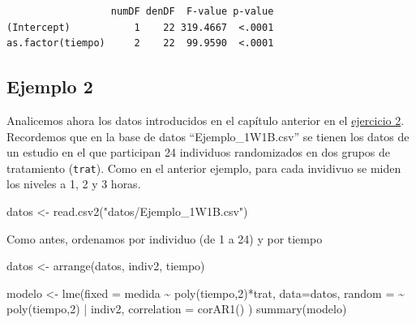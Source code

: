 \documentclass[
]{book}
\newenvironment{Shaded}{\begin{snugshade}}{\end{snugshade}}
\newcommand{\AttributeTok}[1]{\textcolor[rgb]{0.77,0.63,0.00}{#1}}
\newcommand{\DecValTok}[1]{\textcolor[rgb]{0.00,0.00,0.81}{#1}}
\newcommand{\FunctionTok}[1]{\textcolor[rgb]{0.00,0.00,0.00}{#1}}
\newcommand{\NormalTok}[1]{#1}
\newcommand{\OtherTok}[1]{\textcolor[rgb]{0.56,0.35,0.01}{#1}}
\newcommand{\SpecialCharTok}[1]{\textcolor[rgb]{0.00,0.00,0.00}{#1}}
\newcommand{\StringTok}[1]{\textcolor[rgb]{0.31,0.60,0.02}{#1}}
\begin{document}
\begin{verbatim}
                  numDF denDF  F-value p-value
(Intercept)           1    22 319.4667  <.0001
as.factor(tiempo)     2    22  99.9590  <.0001
\end{verbatim}

\hypertarget{ejemplo-2}{%
\subsection{Ejemplo 2}\label{ejemplo-2}}

Analicemos ahora los datos introducidos en el capítulo anterior en el \protect\hyperlink{Ejercicio2}{ejercicio 2}. Recordemos que en la base de datos ``Ejemplo\_1W1B.csv'' se tienen los datos de un estudio en el que participan 24 individuos randomizados en dos grupos de tratamiento (\texttt{trat}). Como en el anterior ejemplo, para cada invidivuo se miden los niveles a 1, 2 y 3 horas.

\begin{Shaded}
\begin{Highlighting}[]
\NormalTok{datos }\OtherTok{\textless{}{-}} \FunctionTok{read.csv2}\NormalTok{(}\StringTok{"datos/Ejemplo\_1W1B.csv"}\NormalTok{)}
\end{Highlighting}
\end{Shaded}

Como antes, ordenamos por individuo (de 1 a 24) y por tiempo

\begin{Shaded}
\begin{Highlighting}[]
\NormalTok{datos }\OtherTok{\textless{}{-}} \FunctionTok{arrange}\NormalTok{(datos, indiv2, tiempo)}
\end{Highlighting}
\end{Shaded}

\begin{Shaded}
\begin{Highlighting}[]
\NormalTok{modelo }\OtherTok{\textless{}{-}} \FunctionTok{lme}\NormalTok{(}\AttributeTok{fixed =}\NormalTok{ medida }\SpecialCharTok{\textasciitilde{}} \FunctionTok{poly}\NormalTok{(tiempo,}\DecValTok{2}\NormalTok{)}\SpecialCharTok{*}\NormalTok{trat, }
              \AttributeTok{data=}\NormalTok{datos,}
              \AttributeTok{random =} \SpecialCharTok{\textasciitilde{}} \FunctionTok{poly}\NormalTok{(tiempo,}\DecValTok{2}\NormalTok{) }\SpecialCharTok{|}\NormalTok{ indiv2,}
              \AttributeTok{correlation =} \FunctionTok{corAR1}\NormalTok{()}
\NormalTok{              )}
\FunctionTok{summary}\NormalTok{(modelo)}
\end{Highlighting}
\end{Shaded}
\end{document}
